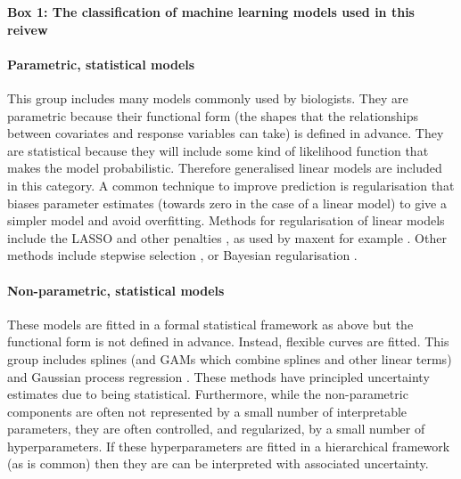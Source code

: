 \documentclass[12pt,]{article}
\let\oldparagraph\paragraph
\renewcommand{\paragraph}[1]{\oldparagraph{#1}\mbox{}}
\begin{document}
\begin{figure*}[t]
\centering
\colorbox{boxcolour}{
\begin{minipage}{1.\textwidth}


\setlength{\parindent}{3mm}
\noindent\textsf{\textbf{Box 1: The classification of machine learning models used in this reivew}}\scriptsize 
\linespread{0.1}
\vspace{-4mm}
\paragraph{Parametric, statistical models}
This group includes many models commonly used by biologists.
They are parametric because their functional form (the shapes that the relationships between covariates and response variables can take) is defined in advance.
They are statistical because they will include some kind of likelihood function that makes the model probabilistic.
Therefore generalised linear models are included in this category.
A common technique to improve prediction is regularisation that biases parameter estimates (towards zero in the case of a linear model) to give a simpler model and avoid overfitting.
Methods for regularisation of linear models include the LASSO and other penalties \citep{tibshirani1996regression, zou2005regularization}, as used by maxent for example  \citep{maxent}. 
Other methods include stepwise selection \citep{hocking1976biometrics}, or Bayesian regularisation \citep{park2008bayesian, liu2018bayesian}.

\paragraph{Non-parametric, statistical models}
These models are fitted in a formal statistical framework as above but the functional form is not defined in advance.
Instead, flexible curves are fitted.
This group includes splines (and GAMs which combine splines and other linear terms) and Gaussian process regression \citep{rasmussen2004gaussian}.
These methods have principled uncertainty estimates due to being statistical.
Furthermore, while the non-parametric components are often not represented by a small number of interpretable parameters, they are often controlled, and regularized, by a small number of hyperparameters.
If these hyperparameters are fitted in a hierarchical framework (as is common) then they are can be interpreted with associated uncertainty.


\end{minipage}}
\end{figure*}
\end{document}
